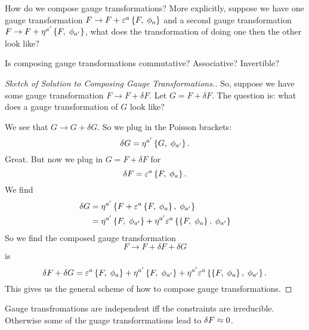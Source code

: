 How do we compose gauge transformations? More explicitly, suppose we
have one gauge transformation 
$F\to F + \varepsilon^{a}\left\{F,\;\phi_{a}\right\}$
and a second gauge transformation 
$F\to F + \eta^{a'}\left\{F,\;\phi_{a'}\right\}$,
what does the transformation of doing one then the other look like? 

Is composing gauge transformations commutative? Associative? Invertible?

\begin{proof}[Sketch of Solution to Composing Gauge
Transformations.]
So, suppose we have some gauge transformation $F\to F+\delta F$. Let
$G=F+\delta F$. The question is: what does a gauge transformation of $G$
look like?

We see that $G\to G+\delta G$. So we plug in the Poisson brackets:
\begin{equation}
\delta G = \eta^{a'}\left\{G,\;\phi_{a'}\right\}.
\end{equation}
Great. But now we plug in $G=F+\delta F$ for 
\begin{equation}
\delta F = \varepsilon^{a}\left\{F,\;\phi_{a}\right\}.
\end{equation}
We find
\begin{equation}
\begin{split}
\delta G &= \eta^{a'}\left\{F+\varepsilon^{a}\left\{F,\;\phi_{a}\right\},\;\phi_{a'}\right\}\\
&= \eta^{a'}\left\{F,\;\phi_{a'}\right\}+\eta^{a'}\varepsilon^{a}\left\{\left\{F,\;\phi_{a}\right\},\;\phi_{a'}\right\}
\end{split}
\end{equation}
So we find the composed gauge transformation
\begin{equation}
F\to F + \delta F + \delta G
\end{equation}
is
\begin{equation}
\delta F + \delta G = \varepsilon^{a}\left\{F,\;\phi_{a}\right\}+\eta^{a'}\left\{F,\;\phi_{a'}\right\}+\eta^{a'}\varepsilon^{a}\left\{\left\{F,\;\phi_{a}\right\},\;\phi_{a'}\right\}.
\end{equation}
This gives us the general scheme of how to compose gauge transformations.
\end{proof}

\begin{proposition}
Gauge transfromations are independent iff the constraints are
irreducible. Otherwise some of the guage transforrmations lead to
$\delta F\approx 0$.
\end{proposition}

